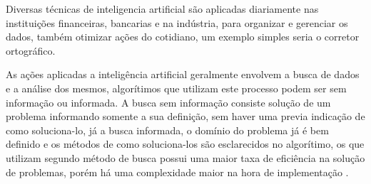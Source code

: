 \documentclass[
12pt,				%
oneside,			%
a4paper,			%
english,			%
french,				%
spanish,			%
brazil				%
]{abntex2}
\begin{document}


Diversas técnicas de inteligencia artificial são aplicadas diariamente nas instituições financeiras, bancarias e na indústria, para organizar e gerenciar os dados, também otimizar ações do cotidiano, um exemplo simples seria o corretor ortográfico. 

As ações aplicadas a inteligência artificial geralmente envolvem a busca de dados e a análise dos mesmos, algorítimos que utilizam este processo podem ser sem informação ou informada. A busca sem informação consiste solução de um problema informando somente a sua definição, sem haver uma previa indicação de como soluciona-lo, já a busca informada, o domínio do problema já é bem definido e os métodos de como soluciona-los são esclarecidos no algorítimo, os que utilizam segundo método de busca possui uma maior taxa de eficiência na solução de problemas, porém há uma complexidade maior na hora de implementação \cite{russell2016artificial}.   


\end{document}
